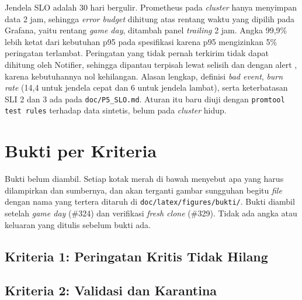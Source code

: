 Jendela SLO adalah 30 hari bergulir. Prometheus pada \textit{cluster} hanya menyimpan data 2 jam, sehingga \textit{error budget} dihitung atas rentang waktu yang dipilih pada Grafana, yaitu rentang \textit{game day}, ditambah panel \textit{trailing} 2 jam. Angka 99,9\% lebih ketat dari kebutuhan p95 pada spesifikasi karena p95 mengizinkan 5\% peringatan terlambat. Peringatan yang tidak pernah terkirim tidak dapat dihitung oleh Notifier, sehingga dipantau terpisah lewat selisih  dan  dengan alert , karena kebutuhannya nol kehilangan. Alasan lengkap, definisi \textit{bad event}, \textit{burn rate} (14,4 untuk jendela cepat dan 6 untuk jendela lambat), serta keterbatasan SLI 2 dan 3 ada pada \texttt{doc/P5\_SLO.md}. Aturan itu baru diuji dengan \texttt{promtool test rules} terhadap data sintetis, belum pada \textit{cluster} hidup.

\section{Bukti per Kriteria}

Bukti belum diambil. Setiap kotak merah di bawah menyebut apa yang harus dilampirkan dan sumbernya, dan akan terganti gambar sungguhan begitu \textit{file} dengan nama yang tertera ditaruh di \texttt{doc/latex/figures/bukti/}. Bukti diambil setelah \textit{game day} (\#324) dan verifikasi \textit{fresh clone} (\#329). Tidak ada angka atau keluaran yang ditulis sebelum bukti ada.

\subsection{Kriteria 1: Peringatan Kritis Tidak Hilang}


\subsection{Kriteria 2: Validasi dan Karantina}


